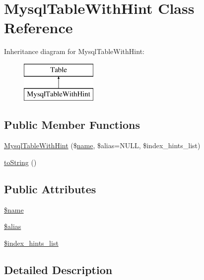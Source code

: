 \hypertarget{classMysqlTableWithHint}{}\section{Mysql\+Table\+With\+Hint Class Reference}
\label{classMysqlTableWithHint}
Inheritance diagram for Mysql\+Table\+With\+Hint\+:\begin{figure}[H]
\begin{center}
\leavevmode
\includegraphics[height=2.000000cm]{classMysqlTableWithHint}
\end{center}
\end{figure}
\subsection*{Public Member Functions}
\begin{DoxyCompactItemize}
\item 
\hyperlink{classMysqlTableWithHint_aa77b8f9ab560a504ab1e24786f77f3a7}{Mysql\+Table\+With\+Hint} (\$\hyperlink{common_8js_a22c29d2aa8ed6161ce8faa718ef76e68}{name}, \$alias=N\+U\+LL, \$index\+\_\+hints\+\_\+list)
\item 
\hyperlink{classMysqlTableWithHint_ad4123d7369e2e100a6189767d3d7e78b}{to\+String} ()
\end{DoxyCompactItemize}
\subsection*{Public Attributes}
\begin{DoxyCompactItemize}
\item 
\hyperlink{classMysqlTableWithHint_a38c6eb1620ea15d06902d2fafb991776}{\$name}
\item 
\hyperlink{classMysqlTableWithHint_a71f2f396bdbde2b55444e8f142c31816}{\$alias}
\item 
\hyperlink{classMysqlTableWithHint_ac389d7382100dd008addab6fbbbe0032}{\$index\+\_\+hints\+\_\+list}
\end{DoxyCompactItemize}


\subsection{Detailed Description}


